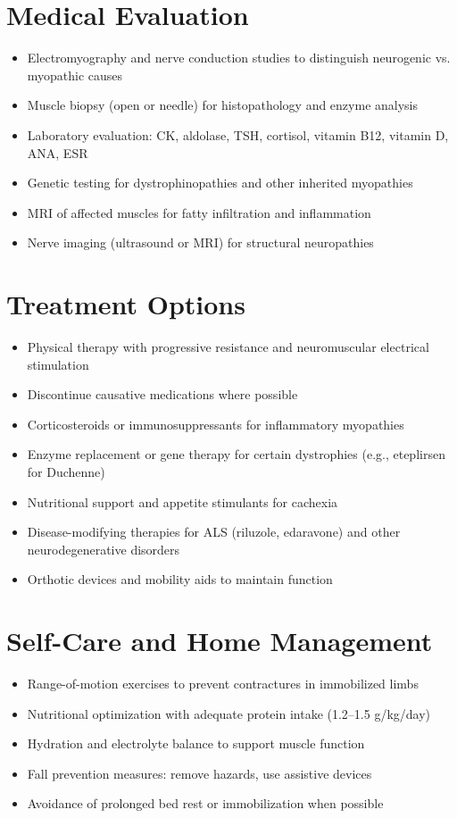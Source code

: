 \section*{Medical Evaluation}
\begin{itemize}
  \item Electromyography and nerve conduction studies to distinguish neurogenic vs. myopathic causes
  \item Muscle biopsy (open or needle) for histopathology and enzyme analysis
  \item Laboratory evaluation: CK, aldolase, TSH, cortisol, vitamin B12, vitamin D, ANA, ESR
  \item Genetic testing for dystrophinopathies and other inherited myopathies
  \item MRI of affected muscles for fatty infiltration and inflammation
  \item Nerve imaging (ultrasound or MRI) for structural neuropathies
\end{itemize}

\section*{Treatment Options}
\begin{itemize}
  \item Physical therapy with progressive resistance and neuromuscular electrical stimulation
  \item Discontinue causative medications where possible
  \item Corticosteroids or immunosuppressants for inflammatory myopathies
  \item Enzyme replacement or gene therapy for certain dystrophies (e.g., eteplirsen for Duchenne)
  \item Nutritional support and appetite stimulants for cachexia
  \item Disease-modifying therapies for ALS (riluzole, edaravone) and other neurodegenerative disorders
  \item Orthotic devices and mobility aids to maintain function
\end{itemize}

\section*{Self-Care and Home Management}
\begin{itemize}
  \item Range-of-motion exercises to prevent contractures in immobilized limbs
  \item Nutritional optimization with adequate protein intake (1.2--1.5 g/kg/day)
  \item Hydration and electrolyte balance to support muscle function
  \item Fall prevention measures: remove hazards, use assistive devices
  \item Avoidance of prolonged bed rest or immobilization when possible
\end{itemize}

